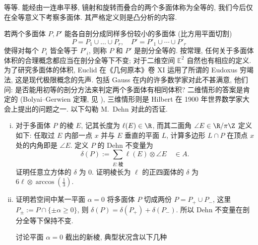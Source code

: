 \begin{Exercises}
\begin{center}
\end{center}
	等等. 能经由一连串平移, 镜射和旋转而叠合的两个多面体称为全等的, 我们今后仅在全等意义下考察多面体. 其严格定义则是凸分析的内容.
	
	若两个多面体 $P, P'$ 能各自剖分成同样多份较小的多面体 (比方用平面切割)
	\[ P = P_1 \cup \ldots \cup P_r, \quad P' = P'_1 \cup \cdots \cup P'_r \]
	使得对每个 $P_i$ 皆全等于 $P'_i$, 则称 $P$ 和 $P'$ 是剖分全等的. 按常理, 任何关于多面体体积的合理概念都应当在剖分全等下不变; 对于二维空间 $\mathbb{E}^2$ 自然也有相应的定义. 为了研究多面体的体积, Euclid 在《几何原本》卷 XI 运用了所谓的 Eudoxus 穷竭法, 这是现代极限概念的先声. 包括 Gauss 在内的许多数学家对此不甚满意, 他们问: 是否能用初等的剖分方法来判定两个多面体有相同体积? 二维情形的答案是肯定的 (Bolyai--Gerwien 定理, 见 \cite[Theorem 24.7]{Har00}), 三维情形则是 Hilbert 在 1900 年世界数学家大会上提出的问题之一. 以下勾勒 M.\ Dehn 对此的否证.
		\begin{enumerate}[(i)]
			\item 对于多面体 $P$ 的棱 $E$, 记其长度为 $\ell(E) \in \R$, 而其二面角 $\angle E \in \R/\pi\Z$ 定义如下: 任取过 $E$ 内部一点 $x$ 并与 $E$ 垂直的平面 $L$, 计算多边形 $L \cap P$ 在顶点 $x$ 处的内角即是 $\angle E$. 定义 $P$ 的 Dehn 不变量为
				\[ \delta(P) := \sum_{E: \text{棱}} \ell(E) \otimes \angle E \quad \in A. \]
				证明任意立方体的 $\delta$ 为 $0$. 证明棱长为 $\ell$ 的正四面体的 $\delta$ 为 $6\ell \otimes \arccos(\frac{1}{3})$.
			\item 证明若空间中某一平面 $\alpha=0$ 将多面体 $P$ 切成两份 $P = P_+ \cup P_-$, 这里 $P_{\pm} := P \cap \{\pm\alpha \geq 0 \}$, 则 $\delta(P) = \delta(P_+) + \delta(P_-)$. 所以 Dehn 不变量在剖分全等下保持不变.
				\begin{hint}
					讨论平面 $\alpha=0$ 截出的新棱, 典型状况含以下几种
					\begin{center}
\end{center}
\end{hint}
\end{enumerate}
\end{Exercises}
